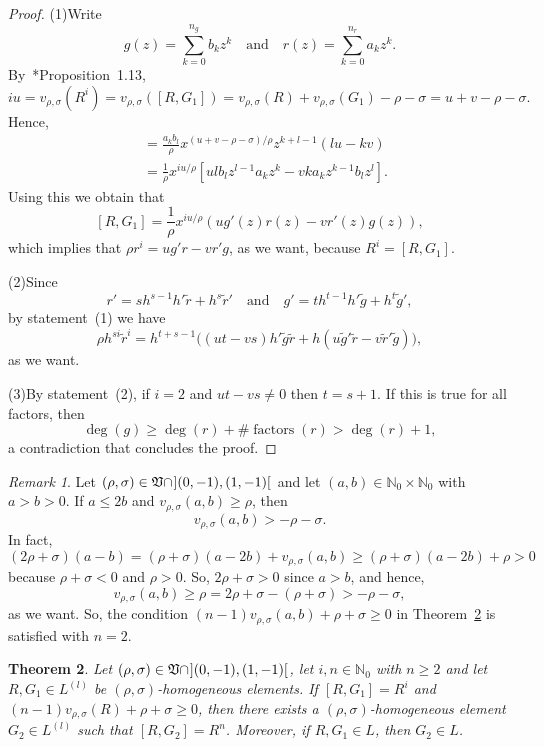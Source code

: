 \documentclass[reqno,a4paper]{amsart}
\newtheorem{theorem}{Theorem}[section]
\theoremstyle{definition}
\theoremstyle{remark}
\newtheorem{remark}[theorem]{Remark}
\DeclareMathOperator{\factors}{factors}
\begin{document}
\begin{proof} (1)\enspace Write
$$
g(z)=\sum_{k=0}^{n_g}b_k z^k\quad\text{and}\quad r(z)=\sum_{k=0}^{n_r}a_k z^k.
$$
By~\cite{GGV}*{Proposition~1.13},
$$
iu=v_{\rho,\sigma}(R^i)=v_{\rho,\sigma}([R,G_1]) = v_{\rho,\sigma}(R) + v_{\rho,\sigma}(G_1) - \rho - \sigma = u + v - \rho - \sigma.
$$
Hence,
\begin{align*}
[x^{u/\rho}a_k z^k, x^{v/\rho}b_l z^l]&=\frac{a_k b_l}{\rho}x^{(u+v-\rho-\sigma)/\rho}z^{k+l-1}(lu-kv)\\
%
&= \frac {1}{\rho} x^{i u/\rho}[u l b_l z^{l-1} a_k z^k-v k a_k z^{k-1} b_l z^l].
\end{align*}
Using this we obtain that
$$
[R,G_1]=\frac 1{\rho} x^{iu/\rho}(u g'(z) r(z) - v r'(z)g(z)),
$$
which implies that $\rho r^i=u g' r - v r'g$, as we want,  because $R^i=[R,G_1]$.

\smallskip

\noindent (2)\enspace Since
$$
r' = s h^{s-1}h'\tilde{r} + h^s \tilde{r}'\quad\text{and} \quad g'=th^{t-1}h'\tilde{g}+h^t\tilde{g}',
$$
by statement~(1) we have
$$
\rho h^{si}\tilde{r}^i = h^{t+s-1}\bigl((ut-vs)h'\tilde{g}\tilde{r} + h(u \tilde{g}' \tilde{r} - v\tilde{r}' \tilde{g})\bigr),
$$
as we want.

\smallskip

\noindent (3)\enspace By statement~(2), if $i=2$ and $ut-vs\ne 0$ then $t=s+1$. If this is true for all factors, then
$$
\deg(g)\ge \deg(r)+\#\factors(r)>\deg(r)+1,
$$
a contradiction that concludes the proof.
\end{proof}

\begin{remark}\label{condicion para v sub rho sigma2} Let $(\rho,\sigma)\in\mathfrak{V}\cap \hspace{0.7pt}](0,-1),(1,-1)[\hspace{0.7pt}$ and let $(a,b)\in \mathds{N}_0\times \mathds{N}_0$ with $a>b>0$. If $a\le 2b$ and $v_{\rho,\sigma}(a,b)\ge \rho$, then
$$
v_{\rho,\sigma}(a,b)> -\rho-\sigma.
$$
In fact,
$$
(2\rho+\sigma)(a-b)=(\rho+\sigma)(a-2b)+v_{\rho,\sigma}(a,b)\ge (\rho+\sigma)(a-2b) + \rho> 0
$$
because $\rho+\sigma<0$ and $\rho>0$. So, $2\rho+\sigma>0$ since $a>b$, and hence,
$$
v_{\rho,\sigma}(a,b)\ge \rho = 2\rho+\sigma - (\rho+\sigma)> -\rho-\sigma,
$$
as we want. So, the condition $(n-1)v_{\rho,\sigma}(a,b)+\rho+\sigma\ge 0$ in Theorem~\ref{reduccion de j} is satisfied with $n=2$.
\end{remark}

\begin{theorem}\label{reduccion de j} Let $(\rho,\sigma)\in\mathfrak{V}\cap \hspace{0.7pt}](0,-1),(1,-1)[\hspace{0.7pt}$, let $i,n\in \mathds{N}_0$ with $n\ge 2$ and let $R,G_1\in L^{(l)}$ be $(\rho,\sigma)$-homogeneous elements. If $[R,G_1]=R^i$ and $(n-1)v_{\rho,\sigma}(R)+\rho+\sigma\ge 0$, then there exists a $(\rho,\sigma)$-homogeneous element $G_2\in L^{(l)}$ such that $[R,G_2]=R^n$. Moreover, if $R,G_1\in L$, then $G_2\in L$.
\end{theorem}
\end{document}
